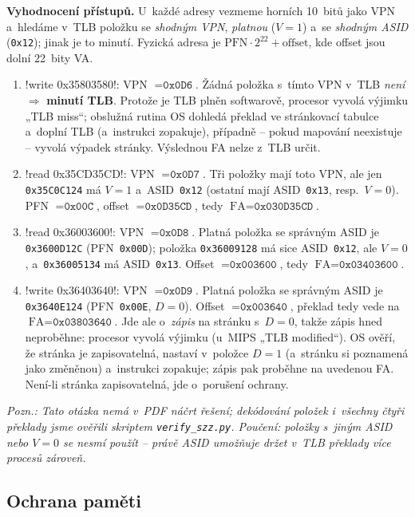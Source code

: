 \begin{priklad}
\textbf{Vyhodnocení přístupů.} U~každé adresy vezmeme horních 10~bitů jako VPN a~hledáme v~TLB položku se \emph{shodným VPN}, \emph{platnou} ($V{=}1$) a~se \emph{shodným ASID} (\texttt{0x12}); jinak je to minutí. Fyzická adresa je $\text{PFN}\cdot2^{22}+\text{offset}$, kde offset jsou dolní 22~bity VA.
\begin{enumerate}
\item \cd!write 0x35803580!: VPN $=\texttt{0x0D6}$. Žádná položka s~tímto VPN v~TLB \emph{není} $\Rightarrow$ \textbf{minutí TLB}. Protože je TLB plněn softwarově, procesor vyvolá výjimku „TLB miss``; obslužná rutina OS dohledá překlad ve stránkovací tabulce a~doplní TLB (a~instrukci zopakuje), případně -- pokud mapování neexistuje -- vyvolá výpadek stránky. Výslednou FA nelze z~TLB určit.
\item \cd!read 0x35CD35CD!: VPN $=\texttt{0x0D7}$. Tři položky mají toto VPN, ale jen \texttt{0x35C0C124} má $V{=}1$ a~ASID~\texttt{0x12} (ostatní mají ASID~\texttt{0x13}, resp.\ $V{=}0$). PFN $=\texttt{0x00C}$, offset $=\texttt{0x0D35CD}$, tedy $\text{FA}=\boxed{\texttt{0x030D35CD}}$.
\item \cd!read 0x36003600!: VPN $=\texttt{0x0D8}$. Platná položka se správným ASID je \texttt{0x3600D12C} (PFN~\texttt{0x00D}); položka \texttt{0x36009128} má sice ASID~\texttt{0x12}, ale $V{=}0$, a~\texttt{0x36005134} má ASID~\texttt{0x13}. Offset $=\texttt{0x003600}$, tedy $\text{FA}=\boxed{\texttt{0x03403600}}$.
\item \cd!write 0x36403640!: VPN $=\texttt{0x0D9}$. Platná položka se správným ASID je \texttt{0x3640E124} (PFN~\texttt{0x00E}, $D{=}0$). Offset $=\texttt{0x003640}$, překlad tedy vede na $\text{FA}=\boxed{\texttt{0x03803640}}$. Jde ale o~\emph{zápis} na stránku s~$D{=}0$, takže zápis hned neproběhne: procesor vyvolá výjimku (u~MIPS „TLB modified``). OS ověří, že stránka je zapisovatelná, nastaví v~položce $D{=}1$ (a~stránku si poznamená jako změněnou) a~instrukci zopakuje; zápis pak proběhne na uvedenou FA. Není-li stránka zapisovatelná, jde o~porušení ochrany.
\end{enumerate}
\textit{Pozn.: Tato otázka nemá v~PDF náčrt řešení; dekódování položek i~všechny čtyři překlady jsme ověřili skriptem \texttt{verify\_szz.py}. Poučení: položky s~jiným ASID nebo $V{=}0$ se \emph{nesmí} použít -- právě ASID umožňuje držet v~TLB překlady více procesů zároveň.}
\end{priklad}

\subsection{Ochrana paměti}

